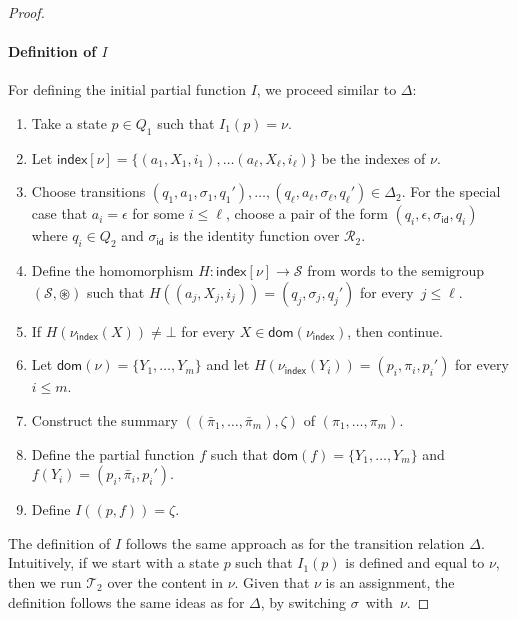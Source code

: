 \documentclass[
a4paper
]{article}
\theoremstyle{plain}
\theoremstyle{definition}
\theoremstyle{remark}
\newcommand{\dom}{\operatorname{dom}}
\newcommand{\Reg}{\mathcal{R}}
\newcommand{\nsst}{\mathcal{T}}
\newcommand{\indx}{\operatorname{index}}
\newcommand{\indxnu}{\nu_{\indx}}
\renewcommand{\operatorname}[1]{\textsf{#1}}
\begin{document}
\begin{proof}
\paragraph{Definition of $I$} For defining the initial partial function $I$, we proceed similar to $\Delta$:
\begin{enumerate}
	\item Take a state $p \in Q_1$ such that $I_1(p) = \nu$.
	\item Let $\indx[\nu] = \{(a_1, X_1, i_1), \ldots (a_\ell, X_\ell, i_\ell)\}$ be the indexes of $\nu$.
	\item Choose transitions $(q_1, a_1, \sigma_1, q_1'), \ldots, (q_\ell, a_\ell, \sigma_\ell, q_\ell') \in \Delta_2$.
	For the special case that $a_i = \epsilon$ for some $i \leq \ell$, choose a pair of the form $(q_i, \epsilon, \sigma_{\operatorname{id}}, q_i)$ where $q_i \in Q_2$ and $\sigma_{\operatorname{id}}$ is the identity function over $\Reg_2$.
	\item Define the homomorphism $H: \indx[\nu] \to \mathcal{S}$ from words to the semigroup $(\mathcal{S}, \circledast)$ such that $H((a_j, X_j, i_j)) = (q_j, \sigma_j, q_j')$ for every~$j \leq \ell$.  
	\item If $H(\indxnu(X)) \neq \bot$ for every $X \in \dom(\indxnu)$, then continue.
	\item Let $\dom(\nu) = \{Y_1, \ldots, Y_m\}$ and let $H(\indxnu(Y_i)) = (p_i, \pi_i, p_i')$ for every $i \leq m$. 
	\item Construct the summary $((\bar{\pi}_1, \ldots, \bar{\pi}_m), \zeta)$ of $(\pi_1, \ldots, \pi_m)$.
	\item Define the partial function $f$ such that $\dom(f) =\{Y_1, \ldots, Y_m\}$ and $f(Y_i) = (p_i, \bar{\pi}_i, p_i')$.
	\item Define $I((p, f)) = \zeta$. 
\end{enumerate}
The definition of $I$ follows the same approach as for the transition relation $\Delta$. Intuitively, if we start with a state $p$ such that $I_1(p)$ is defined and equal to $\nu$, then we run $\nsst_2$ over the content in $\nu$. Given that $\nu$ is an assignment, the definition follows the same ideas as for $\Delta$, by switching $\sigma$~with~$\nu$.  


\end{proof}
\end{document}
